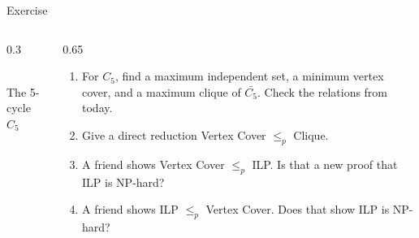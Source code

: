\documentclass[10pt,aspectratio=169]{beamer}
\newcommand{\pentagon}[5]{%
  \node[#1] (v1) at (90:1.6)  {1};
  \node[#2] (v2) at (18:1.6)  {2};
  \node[#3] (v3) at (-54:1.6) {3};
  \node[#4] (v4) at (-126:1.6) {4};
  \node[#5] (v5) at (162:1.6) {5};
}
\begin{document}
\begin{frame}{Exercise}
  \begin{columns}[c]
    \begin{column}{0.3\textwidth}
      \begin{center}
      \\[2pt]
      \small The 5-cycle $C_5$
      \end{center}
    \end{column}
    \begin{column}{0.65\textwidth}
      \begin{enumerate}
        \item For $C_5$, find a maximum independent set, a minimum vertex
              cover, and a maximum clique of $\bar{C_5}$. Check the
              relations from today.
        \item Give a direct reduction Vertex Cover $\le_p$ Clique.
        \item A friend shows Vertex Cover $\le_p$ ILP. Is that a new proof
              that ILP is NP-hard?
        \item A friend shows ILP $\le_p$ Vertex Cover. Does that show ILP is
              NP-hard?
      \end{enumerate}
    \end{column}
  \end{columns}
\end{frame}
\end{document}

